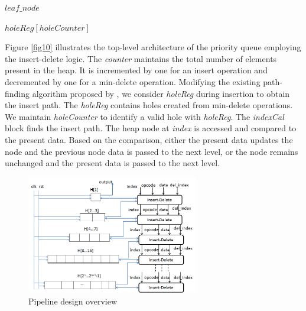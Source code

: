 \begin{algorithm}
\caption{$findNode(counter)$}
\label{algo3}
\begin{algorithmic}[1]
    \ENDFOR
    \RETURN $leaf\_node$
\end{algorithmic}
\end{algorithm}

\begin{algorithm}
\caption{$holeCal(holeCounter)$}
\label{algo4}
\begin{algorithmic}[1]
    \RETURN $holeReg[holeCounter]$
\end{algorithmic}
\end{algorithm}

\begin{algorithm}
\caption{$indexCal$($insert\_path$, $level$, $index$)}
\label{algo5}
\begin{algorithmic}[1]
    \ELSE
    \ENDIF
\end{algorithmic}
\end{algorithm}

Figure \ref{fig10} illustrates the top-level architecture of the priority queue employing the insert-delete logic.
The {\it counter} maintains the total number of elements present in the heap.
It is incremented by one for an insert operation and decremented by one for a min-delete operation.
Modifying the existing path-finding algorithm proposed by \cite{pq6}, we consider {\it holeReg} during insertion to obtain the insert path.
The {\it holeReg} contains holes created from min-delete operations.
We maintain {\it holeCounter} to identify a valid hole with {\it holeReg}.
The {\it indexCal} block finds the insert path.
The heap node at {\it index} is accessed and compared to the present data.
Based on the comparison, either the present data updates the node and the previous node data is passed to the next level, or the node remains unchanged and the present data is passed to the next level.


\begin{figure}[!ht]
  \centering
  \includegraphics[width=7.5cm]{fig/1.png}
      \caption{Pipeline design overview}
    \label{fig11}
\end{figure}

